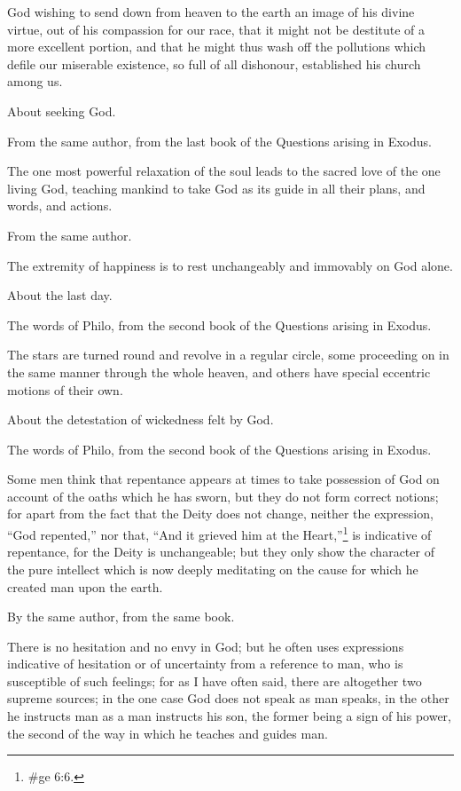 God wishing to send down from heaven to the earth an image of his divine virtue, out of his
compassion for our race, that it might not be destitute of a more excellent portion, and that he
might thus wash off the pollutions which defile our miserable existence, so full of all dishonour,
established his church among us.

About seeking God.

From the same author, from the last book of the Questions arising in Exodus.

The one most powerful relaxation of the soul leads to the sacred love of the one living God,
teaching mankind to take God as its guide in all their plans, and words, and actions.

From the same author.

The extremity of happiness is to rest unchangeably and immovably on God alone.

About the last day.

The words of Philo, from the second book of the Questions arising in Exodus.

The stars are turned round and revolve in a regular circle, some proceeding on in the same
manner through the whole heaven, and others have special eccentric motions of their own.

About the detestation of wickedness felt by God.

The words of Philo, from the second book of the Questions arising in Exodus.

Some men think that repentance appears at times to take possession of God on account of the
oaths which he has sworn, but they do not form correct notions; for apart from the fact that the
Deity does not change, neither the expression, ``God repented,'' nor that, ``And it grieved him at the
Heart,''\footnote{\#ge 6:6.} is indicative of repentance, for the Deity is unchangeable; but they only show
the character of the pure intellect which is now deeply meditating on the cause for which he
created man upon the earth.

By the same author, from the same book.

There is no hesitation and no envy in God; but he often uses expressions indicative of hesitation
or of uncertainty from a reference to man, who is susceptible of such feelings; for as I have often
said, there are altogether two supreme sources; in the one case God does not speak as man
speaks, in the other he instructs man as a man instructs his son, the former being a sign of his
power, the second of the way in which he teaches and guides man.

